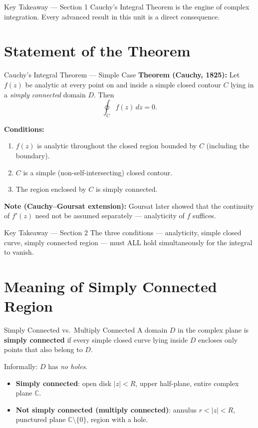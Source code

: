 \documentclass[12pt,a4paper]{article}
\begin{document}
\begin{learnbox}{Key Takeaway --- Section 1}
Cauchy's Integral Theorem is the engine of complex integration.
Every advanced result in this unit is a direct consequence.
\end{learnbox}

\section{Statement of the Theorem}

\begin{infobox}{Cauchy's Integral Theorem --- Simple Case}
\textbf{Theorem (Cauchy, 1825):} Let $f(z)$ be analytic at every point on and inside a
simple closed contour $C$ lying in a \emph{simply connected} domain $D$.
Then
\[
  \oint_{C} f(z)\,dz = 0.
\]

\textbf{Conditions:}
\begin{enumerate}
  \item $f(z)$ is analytic throughout the closed region bounded by $C$ (including the boundary).
  \item $C$ is a simple (non-self-intersecting) closed contour.
  \item The region enclosed by $C$ is simply connected.
\end{enumerate}

\textbf{Note (Cauchy--Goursat extension):} Goursat later showed that the continuity of
$f'(z)$ need not be assumed separately --- analyticity of $f$ suffices.
\end{infobox}

\begin{learnbox}{Key Takeaway --- Section 2}
The three conditions --- analyticity, simple closed curve, simply connected region --- must
ALL hold simultaneously for the integral to vanish.
\end{learnbox}

\section{Meaning of Simply Connected Region}

\begin{infobox}{Simply Connected vs.\ Multiply Connected}
A domain $D$ in the complex plane is \textbf{simply connected} if every simple closed curve
lying inside $D$ encloses only points that also belong to $D$.

Informally: $D$ has \emph{no holes}.

\begin{itemize}
  \item \textbf{Simply connected}: open disk $|z| < R$, upper half-plane, entire complex plane $\mathbb{C}$.
  \item \textbf{Not simply connected (multiply connected)}: annulus $r < |z| < R$,
        punctured plane $\mathbb{C} \setminus \{0\}$, region with a hole.
\end{itemize}
\end{infobox}
\end{document}
